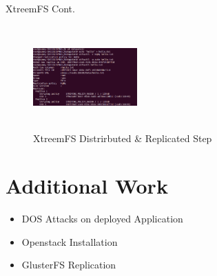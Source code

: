 \documentclass[10pt,xcolor=dvipsnames]{beamer}
\begin{document}
\begin{frame}{XtreemFS Cont.}

\begin{figure}[H]
\begin{center}
\includegraphics[width=4cm,height=4cm]{OSD1.png}
\caption{XtreemFS Distrirbuted \& Replicated Step}
\end{center}
\end{figure}

\end{frame}

\section{Additional Work}
\begin{frame}
\begin{itemize}
\item DOS Attacks on deployed Application
\item Openstack Installation
\item GlusterFS Replication
\end{itemize}
\end{frame}
\end{document}
